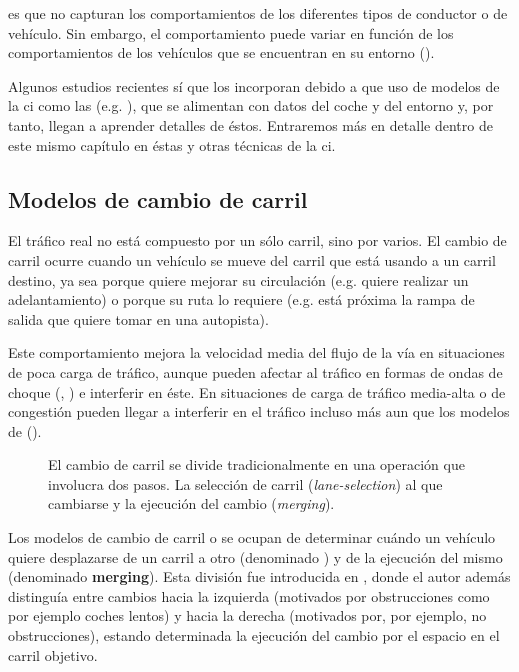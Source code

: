  es que no capturan los comportamientos de los diferentes tipos de conductor o de vehículo. Sin embargo, el comportamiento puede variar en función de los comportamientos de los vehículos que se encuentran en su entorno (\cite{Tordeux2010}).

Algunos estudios recientes sí que los incorporan debido a que uso de modelos de la \gls{ci} como las  (e.g. \cite{Simonelli2009, Fusco2013, Zheng2013}), que se alimentan con datos del coche y del entorno y, por tanto, llegan a aprender detalles de éstos. Entraremos más en detalle dentro de este mismo capítulo en éstas y otras técnicas de la \gls{ci}.


\subsection{Modelos de cambio de carril}

El tráfico real no está compuesto por un sólo carril, sino por varios. El cambio de carril ocurre cuando un vehículo se mueve del carril que está usando a un carril destino, ya sea porque quiere mejorar su circulación (e.g. quiere realizar un adelantamiento) o porque su ruta lo requiere (e.g. está próxima la rampa de salida que quiere tomar en una autopista).

Este comportamiento mejora la velocidad media del flujo de la vía en situaciones de poca carga de tráfico, aunque pueden afectar al tráfico en formas de ondas de choque (\cite{Sasoh2002}, \cite{Jin2006}) e interferir en éste. En situaciones de carga de tráfico media-alta o de congestión pueden llegar a interferir en el tráfico incluso más aun que los modelos de \textit{} (\cite{Laval2006}).

\begin{figure}
	\caption{El cambio de carril se divide tradicionalmente en una operación que involucra dos pasos. La selección de carril (\textit{lane-selection}) al que cambiarse y la ejecución del cambio (\textit{merging}).}
	\label{fig:lane-selection-plus-merging}
\end{figure}

Los modelos de cambio de carril o \textit{} se ocupan de determinar cuándo un vehículo quiere desplazarse de un carril a otro (denominado \textbf{}) y de la ejecución del mismo (denominado \textbf{merging}). Esta división fue introducida en \cite{Sparmann1978}, donde el autor además distinguía entre cambios hacia la izquierda (motivados por obstrucciones como por ejemplo coches lentos) y hacia la derecha (motivados por, por ejemplo, no obstrucciones), estando determinada la ejecución del cambio por el espacio en el carril objetivo.

